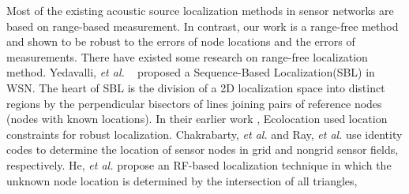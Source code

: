 Most of the existing acoustic source localization methods in sensor networks are based on range-based measurement.
In contrast, our work is a range-free method and shown to be robust to the errors of node locations and the errors of measurements.
There have existed some research on range-free localization method.
Yedavalli, \emph{et al.} ~\cite{yedavalli2008sequence} proposed a Sequence-Based Localization(SBL) in WSN. 
The heart of SBL is the division of a 2D localization space into distinct regions by the perpendicular bisectors of lines joining pairs of reference nodes (nodes with known locations).
In their earlier work \cite{yedavalli2005ecolocation}, Ecolocation used location constraints for robust localization.
Chakrabarty, \emph{et al.} \cite{chakrabarty2002grid} and Ray, \emph{et al.} \cite{ray2004robust} use identity codes to determine the location of sensor nodes in grid and nongrid sensor fields, respectively. 
He, \emph{et al.} \cite{he2003range} propose an RF-based localization technique in which the unknown node location is determined by the intersection of all triangles,
